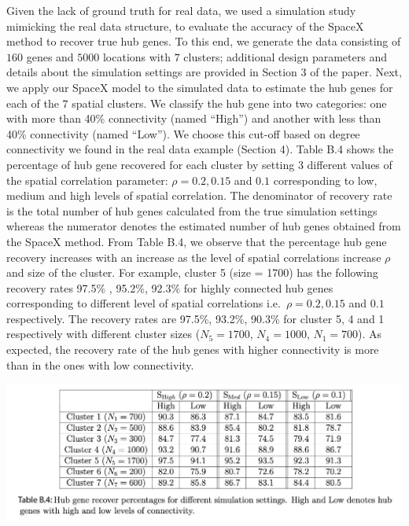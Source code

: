 \documentclass[
]{book}
\begin{document}
Given the lack of ground truth for real data, we used a simulation study mimicking the real data structure, to evaluate the accuracy of the SpaceX method to recover true hub genes. To this end, we generate the data consisting of \(160\) genes and \(5000\) locations with \(7\) clusters; additional design parameters and details about the simulation settings are provided in Section 3 of the paper. Next, we apply our SpaceX model to the simulated data to estimate the hub genes for each of the \(7\) spatial clusters. We classify the hub gene into two categories: one with more than 40\% connectivity (named ``High'') and another with less than 40\% connectivity (named ``Low''). We choose this cut-off based on degree connectivity we found in the real data example (Section 4). Table B.4 shows the percentage of hub gene recovered for each cluster by setting \(3\) different values of the spatial correlation parameter: \(\rho = 0.2, 0.15\) and \(0.1\) corresponding to low, medium and high levels of spatial correlation. The denominator of recovery rate is the total number of hub genes calculated from the true simulation settings whereas the numerator denotes the estimated number of hub genes obtained from the SpaceX method. From Table B.4, we observe that the percentage hub gene recovery increases with an increase as the level of spatial correlations increase \(\rho\) and size of the cluster. For example, cluster 5 (size = 1700) has the following recovery rates 97.5\% , 95.2\%, 92.3\% for highly connected hub genes corresponding to different level of spatial correlations i.e.~\(\rho = 0.2,0.15\) and \(0.1\) respectively. The recovery rates are 97.5\%, 93.2\%, 90.3\% for cluster 5, 4 and 1 respectively with different cluster sizes (\(N_{5}=1700\), \(N_{4}=1000\), \(N_{1}=700\)). As expected, the recovery rate of the hub genes with higher connectivity is more than in the ones with low connectivity.

\begin{center}\includegraphics[width=1.1\linewidth]{images/Table_6} \end{center}
\end{document}
